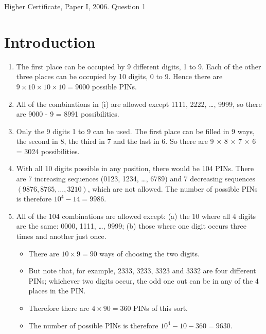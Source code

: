 \documentclass[a4paper,12pt]{article}
\begin{document}
Higher Certificate, Paper I, 2006. Question 1

\section{Introduction}
\begin{enumerate}
    \item The first place can be occupied by 9 different digits, 1 to 9. Each of the other three places can be occupied by 10 digits, 0 to 9.
Hence there are $9 × 10 × 10 × 10 = 9000$ possible PINs.
\item All of the combinations in (i) are allowed except 1111, 2222, …, 9999, so there are 9000 - 9 = 8991 possibilities.

\item Only the 9 digits 1 to 9 can be used. The first place can be filled in 9 ways, the second in 8, the third in 7 and the last in 6. So there are 9 × 8 × 7 × 6 = 3024 possibilities.
\item With all 10 digits possible in any position, there would be 104 PINs. There are 7 increasing sequences (0123, 1234, …, 6789) and 7 decreasing sequences $(9876, 8765, \ldots, 3210)$, which are not allowed. The number of possible PINs is therefore $10^4 - 14 = 9986$.
\item All of the 104 combinations are allowed except:
(a) the 10 where all 4 digits are the same: 0000, 1111, …, 9999;
(b) those where one digit occurs three times and another just once.  \begin{itemize}
    \item There are $10 \times 9 = 90$ ways of choosing the two digits. 
    \item But note that, for example, 2333, 3233, 3323 and 3332 are four different PINs; whichever two digits occur, the odd one out can be in any of the 4 places in the PIN. \item Therefore there are $4 \times 90 = 360$ PINs of this sort.
\item The number of possible PINs is therefore $10^4 - 10 - 360 = 9630$.
\end{itemize}

\end{enumerate}
\end{document}
